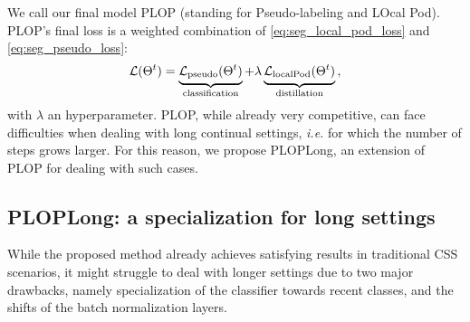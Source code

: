 We call our final model PLOP (standing for Pseudo-labeling and LOcal Pod). PLOP's final loss is a
weighted combination of \autoref{eq:seg_local_pod_loss} and \autoref{eq:seg_pseudo_loss}:
%
\begin{equation}
    \mathcal{L}(\Theta^t) = \underbrace{\strut \mathcal{L}_\text{pseudo}(\Theta^t)}_\text{classification} + \lambda\underbrace{\strut \mathcal{L}_\text{localPod}(\Theta^t)}_\text{distillation}\,,
    \label{eq:seg_complete_loss}
\end{equation}
%
with $\lambda$ an hyperparameter. PLOP, while already very competitive, can face difficulties when
dealing with long continual settings, \textit{i.e.} for which the number of steps grows larger. For
this reason, we propose PLOPLong, an extension of PLOP for dealing with such cases.

\subsection{PLOPLong: a specialization for long settings}\label{sec:seg_plopv2}

While the proposed method already achieves satisfying results in traditional \ac{CSS} scenarios, it might
struggle to deal with longer settings due to two major drawbacks, namely specialization of the
classifier towards recent classes, and the shifts of the batch normalization layers.

